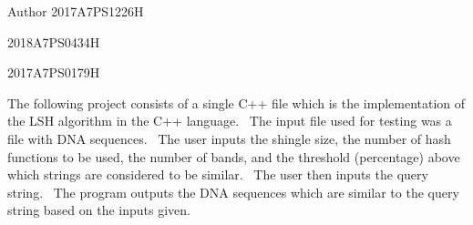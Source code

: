 \begin{DoxyAuthor}{Author}
2017A7\+P\+S1226H 

2018A7\+P\+S0434H 

2017A7\+P\+S0179H
\end{DoxyAuthor}
The following project consists of a single C++ file which is the implementation of the L\+SH algorithm in the C++ language.~\newline
 The input file used for testing was a file with D\+NA sequences.~\newline
 The user inputs the shingle size, the number of hash functions to be used, the number of bands, and the threshold (percentage) above which strings are considered to be similar.~\newline
 The user then inputs the query string.~\newline
 The program outputs the D\+NA sequences which are similar to the query string based on the inputs given.~\newline
 